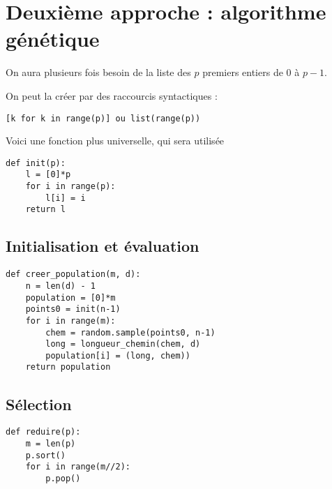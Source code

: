 \section[génétique]{Deuxième approche : algorithme génétique}
On aura plusieurs fois besoin de la liste des $p$ premiers entiers de 0 à $p-1$.

On peut la créer par des raccourcis syntactiques :
\begin{lstlisting}
[k for k in range(p)] ou list(range(p))
\end{lstlisting}
Voici une fonction plus universelle, qui sera utilisée
\begin{lstlisting}
def init(p):
    l = [0]*p
    for i in range(p):
        l[i] = i
    return l
\end{lstlisting}
\subsection{Initialisation et évaluation}
\begin{Exercise}[title = {\bf III.A}]
\begin{lstlisting}
def creer_population(m, d):
    n = len(d) - 1
    population = [0]*m
    points0 = init(n-1)
    for i in range(m):
        chem = random.sample(points0, n-1)
        long = longueur_chemin(chem, d)
        population[i] = (long, chem))
    return population
\end{lstlisting}
\end{Exercise}
\subsection{Sélection}
\begin{Exercise}[title = {\bf III.B}]
\begin{lstlisting}
def reduire(p):
    m = len(p)
    p.sort()
    for i in range(m//2):
        p.pop()
\end{lstlisting}
\end{Exercise}
\newpage
